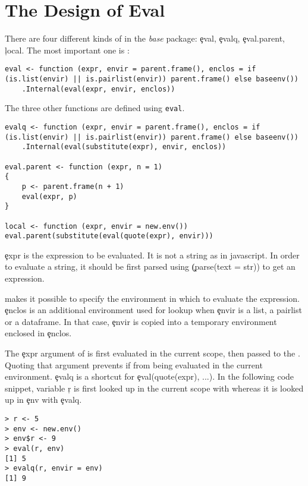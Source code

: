 \documentclass[conference]{IEEEtran}
\begin{document}
\section{The Design of Eval}

There are four different kinds of \eval in the \emph{base} package:  \c{eval}, \c{evalq}, \c{eval.parent},  \c{local}.
The most important one is \eval: 

\begin{lstlisting}
eval <- function (expr, envir = parent.frame(), enclos = if (is.list(envir) || is.pairlist(envir)) parent.frame() else baseenv())  
	.Internal(eval(expr, envir, enclos))
\end{lstlisting}




The three other functions are defined using \lstinline|eval|.

\begin{lstlisting}
evalq <- function (expr, envir = parent.frame(), enclos = if (is.list(envir) || is.pairlist(envir)) parent.frame() else baseenv())  
	.Internal(eval(substitute(expr), envir, enclos))
	
eval.parent <- function (expr, n = 1) 
{
	p <- parent.frame(n + 1)
	eval(expr, p)
}

local <- function (expr, envir = new.env()) eval.parent(substitute(eval(quote(expr), envir)))
\end{lstlisting}


\c{expr} is the expression to be evaluated. It is not a string as in javascript. In order to evaluate a string, it should be first parsed using \c(parse(text = str)) to get an expression.

\eval makes it possible to specify the environment in which to evaluate the expression. \c{enclos} is an additional environment used for lookup when \c{envir} is a list, a pairlist or a dataframe. In that case, \c{envir} is copied into a temporary environment enclosed in \c{enclos}.

The \c{expr} argument of \eval is first evaluated in the current scope, then passed to the \eval. Quoting that argument prevents if from being evaluated in the current environment. \c{evalq} is a shortcut for \c{eval(quote(expr), ...)}. In the following code snippet, variable \c{r} is first looked up in the current scope with \eval whereas it is looked up in \c{env} with \c{evalq}.

\begin{lstlisting}
> r <- 5
> env <- new.env()
> env$r <- 9
> eval(r, env)
[1] 5
> evalq(r, envir = env)
[1] 9
\end{lstlisting}
\end{document}
